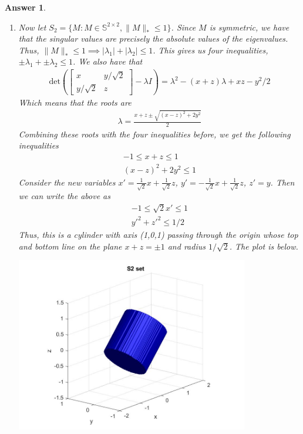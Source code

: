 \documentclass[12pt]{article}
\theoremstyle{colon}
\newtheorem*{answer}{Answer}
\begin{document}
\begin{answer}
\begin{enumerate}[label=\arabic*)]
    \item Now let $S_2 = \{ M : M \in \mathbb{S}^{2 \times 2}, \lVert M \rVert_* \leq 1 \}$. Since $M$ is symmetric, we have that the singular values are precisely the absolute values of the eigenvalues. Thus, $\lVert M \rVert_* \leq 1 \implies \lvert \lambda_1 \rvert + \lvert \lambda_2 \rvert \leq 1$. This gives us four inequalities, $\pm \lambda_1 + \pm \lambda_2 \leq 1$. We also have that
      \begin{gather*}
        \text{det} \left( \begin{bmatrix} x & y/\sqrt{2} \\ y/\sqrt{2} & z \end{bmatrix} - \lambda I \right) = \lambda^2 - (x+z) \lambda + xz - y^2/2
      \end{gather*}
      Which means that the roots are
      \begin{gather*}
        \lambda = \frac{x+z \pm \sqrt{(x-z)^2 + 2y^2}}{2}
      \end{gather*}
      Combining these roots with the four inequalities before, we get the following inequalities
      \begin{gather*}
        -1 \leq x + z \leq 1 \\
        (x - z)^2 + 2 y^2 \leq 1
      \end{gather*}
      Consider the new variables $x' = \frac{1}{\sqrt{2}} x + \frac{1}{\sqrt{2}}z$, $y' = -\frac{1}{\sqrt{2}} x + \frac{1}{\sqrt{2}}z$, $z' = y$. Then we can write the above as
      \begin{gather*}
        -1 \leq \sqrt{2} x' \leq 1 \\
        y'^2 + z'^2 \leq 1/2
      \end{gather*}
      Thus, this is a cylinder with axis (1,0,1) passing through the origin whose top and bottom line on the plane $x+z = \pm 1$ and radius $1/\sqrt{2}$. The plot is below.

      \begin{center}
        \includegraphics[width=0.8\textwidth]{cylinder.jpg}
      \end{center}


\end{enumerate}
\end{answer}
\end{document}
